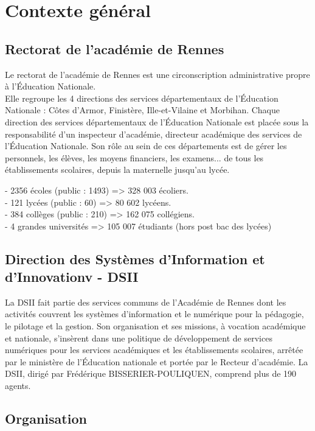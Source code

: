 \documentclass[12pt]{article}
\begin{document}
   

\section{Contexte général}
\subsection{Rectorat de l’académie de Rennes}

Le rectorat de l'académie de Rennes est une circonscription administrative propre à l’Éducation Nationale.\\
Elle regroupe les 4 directions des services départementaux de l'Éducation Nationale : 
Côtes d'Armor, Finistère, Ille-et-Vilaine et Morbihan. Chaque direction des services départementaux de l'Éducation Nationale est placée sous la responsabilité d'un inspecteur d'académie, directeur académique des services de l'Éducation Nationale. Son rôle au sein de ces départements est de gérer les personnels, les élèves, les moyens financiers, les examens... de tous les établissements scolaires, depuis la maternelle jusqu'au lycée.


- 2356 écoles (public : 1493) => 328 003 écoliers.\\


- 121 lycées (public : 60) => 80 602 lycéens.\\


- 384 collèges (public : 210) => 162 075 collégiens.\\

- 4 grandes universités => 105 007 étudiants (hors post bac des lycées)\\

\subsection{Direction des Systèmes d'Information et d'Innovationv - DSII }


La DSII fait partie des services communs de l’Académie de Rennes dont les activités couvrent les systèmes d’information et le numérique pour la pédagogie, le pilotage et la gestion.
Son organisation et ses missions, à vocation académique et nationale, s’insèrent dans une politique de développement de services numériques pour les services académiques et les établissements scolaires, arrêtée par le ministère de l’Éducation nationale et portée par le Recteur d’académie.
La DSII, dirigé par Frédérique BISSERIER-POULIQUEN, comprend plus de 190 agents.
\subsection{Organisation}
\end{document}
